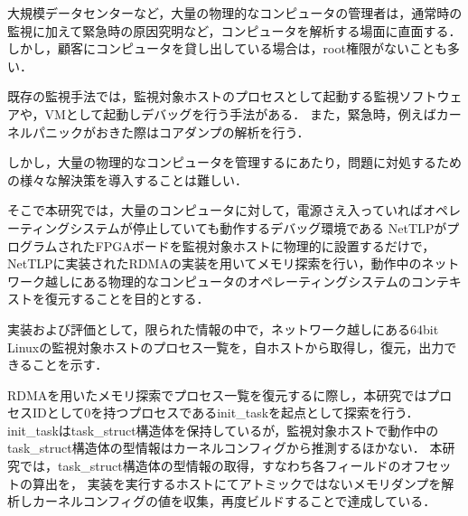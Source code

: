 \begin{jabstract}

大規模データセンターなど，大量の物理的なコンピュータの管理者は，通常時の監視に加えて緊急時の原因究明など，コンピュータを解析する場面に直面する．
しかし，顧客にコンピュータを貸し出している場合は，root権限がないことも多い．

既存の監視手法では，監視対象ホストのプロセスとして起動する監視ソフトウェアや，VMとして起動しデバッグを行う手法がある．
また，緊急時，例えばカーネルパニックがおきた際はコアダンプの解析を行う．

しかし，大量の物理的なコンピュータを管理するにあたり，問題に対処するための様々な解決策を導入することは難しい．

そこで本研究では，大量のコンピュータに対して，電源さえ入っていればオペレーティングシステムが停止していても動作するデバッグ環境である
NetTLPがプログラムされたFPGAボードを監視対象ホストに物理的に設置するだけで，
NetTLPに実装されたRDMAの実装を用いてメモリ探索を行い，動作中のネットワーク越しにある物理的なコンピュータのオペレーティングシステムのコンテキストを復元することを目的とする．

実装および評価として，限られた情報の中で，ネットワーク越しにある64bit Linuxの監視対象ホストのプロセス一覧を，自ホストから取得し，復元，出力できることを示す．

RDMAを用いたメモリ探索でプロセス一覧を復元するに際し，本研究ではプロセスIDとして0を持つプロセスであるinit\_taskを起点として探索を行う．
init\_taskはtask\_struct構造体を保持しているが，監視対象ホストで動作中のtask\_struct構造体の型情報はカーネルコンフィグから推測するほかない．
本研究では，task\_struct構造体の型情報の取得，すなわち各フィールドのオフセットの算出を，
実装を実行するホストにてアトミックではないメモリダンプを解析しカーネルコンフィグの値を収集，再度ビルドすることで達成している．

\end{jabstract}
